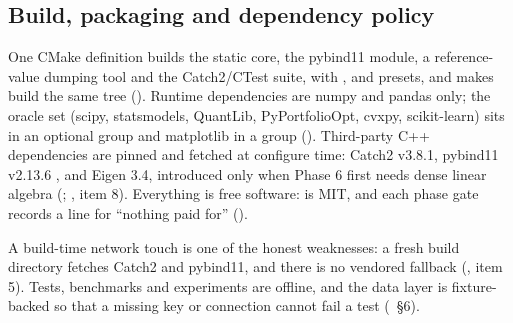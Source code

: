 \documentclass[11pt,a4paper]{article}
\begin{document}
\subsection{Build, packaging and dependency policy}
One CMake definition builds the static core, the pybind11 module, a reference-value dumping tool
and the Catch2/CTest suite, with ,  and  presets, and
 \citep{scikitbuildcore} makes  build the same
tree (). Runtime dependencies are
numpy and pandas only; the oracle set (scipy, statsmodels, QuantLib, PyPortfolioOpt, cvxpy,
scikit-learn) sits in an optional group and matplotlib in a  group
(). Third-party C++ dependencies are pinned and fetched at configure time:
Catch2 v3.8.1, pybind11 v2.13.6 \citep{pybind11}, and Eigen 3.4, introduced only when Phase 6
first needs dense linear algebra (; , item 8).
Everything is free software:  is MIT, and each phase gate records a line for ``nothing
paid for'' ().

A build-time network touch is one of the honest weaknesses: a fresh build directory fetches
Catch2 and pybind11, and there is no vendored fallback
(, item 5). Tests, benchmarks and experiments are offline, and the
data layer is fixture-backed so that a missing key or connection cannot fail a test
(~\S6).
\end{document}
